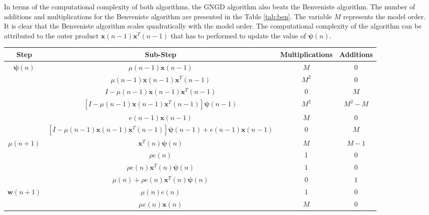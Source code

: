 \noindent{}In terms of the computational complexity of both algorithms, the GNGD algorithm also beats the Benveniste algorithm. The number of additions and multiplications for the Benveniste algorithm are presented in the Table \ref{tab:ben}. The variable $M$ represents the model order. It is clear that the Benveniste algorithm scales quadratically with the model order. The computational complexity of the algorithm can be attributed to the outer product $\textbf{x}(n-1)\textbf{x}^T(n-1)$ that has to performed to update the value of $\bm{\psi}(n)$. 

\begin{table}[H]
\tabulinesep=0.9mm
\centering
\begin{tabu}{|c|c|c|c|}
\hline
Step                   			& Sub-Step & Multiplications & Additions \\ \hline
{} 	& $\mu(n-1)\textbf{x}(n-1)$ 																&$M$         		&0\\  
                       			& $\mu(n-1)\textbf{x}(n-1)\textbf{x}^T(n-1)$       										&$M^2$       		&0\\  
                       			& $I-\mu(n-1)\textbf{x}(n-1)\textbf{x}^T(n-1)$    										&0        			&$M$\\  
                       			& $[I-\mu(n-1)\textbf{x}(n-1)\textbf{x}^T(n-1)]\bm{\psi}(n-1)$       						&$M^2$ 				&$M^2-M$	\\  
                       			& $e(n-1)\textbf{x}(n-1)$       															&$M$        		&0\\  
                       			& $[I-\mu(n-1)\textbf{x}(n-1)\textbf{x}^T(n-1)]\bm{\psi}(n-1) + e(n-1)\textbf{x}(n-1)$  	&0          			&$M$\\ \hline 
{} 		& $\textbf{x}^T(n)\bm{\psi}(n)$ 															&$M$         		&$M-1$\\ 
								& $\rho e(n)$       																		&1        			&$0$\\  
                       			& $\rho e(n) \textbf{x}^T(n)\bm{\psi}(n)$    											&$1$        			&$0$\\  
                       			& $\mu(n)+\rho e(n) \textbf{x}^T(n)\bm{\psi}(n)$       									&$0$ 				&$1$	\\ \hline
{}& $\mu(n)e(n)$ 																			&$1$         		&$0$\\ 
								& $\mu e(n)\textbf{x}(n)$       															&$M$        			&$0$\\  

\end{tabu}
\end{table}
